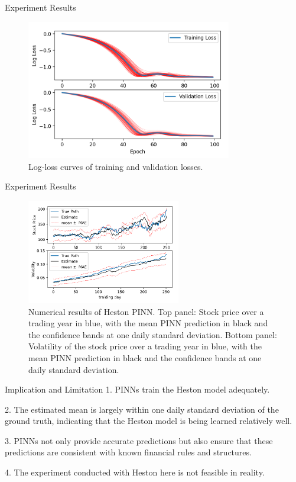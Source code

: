 \begin{frame}{Experiment Results}
\begin{figure}[H]
    \centering
    \includegraphics[width=0.8\textwidth]{img/png3.png}
    \caption{Log-loss curves of training and validation losses.}
    \label{fig:space_time_grid}
\end{figure}
\end{frame}

\begin{frame}{Experiment Results}
\begin{figure}[H]
    \centering
    \includegraphics[width=0.6\textwidth]{img/figure2.png}
    \caption{Numerical results of Heston PINN. Top panel: Stock price over a trading year in blue, with the mean PINN prediction in black and the confidence bands at one daily standard deviation. Bottom panel: Volatility of the stock price over a trading year in blue, with the mean PINN prediction in black and the confidence bands at one daily standard deviation.}
    \label{fig:space_time_grid}
\end{figure}

\end{frame}

\begin{frame}{Implication and Limitation}
    1. PINNs train the Heston model adequately.

    2. The estimated mean is largely within one daily standard deviation of the ground truth, indicating that the Heston model is being learned relatively well.

    3. PINNs not only provide accurate predictions but also ensure that these predictions are consistent with known financial rules and structures. 

    4. The experiment conducted with Heston here is not feasible in reality.

\end{frame}

